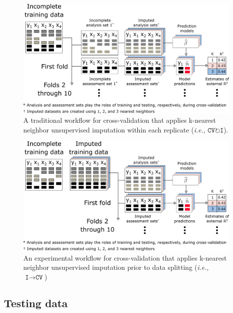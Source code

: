 \documentclass[AMA,STIX1COL,doublespace]{WileyNJD-v2}
\begin{document}
\begin{figure}
\includegraphics[width=1\linewidth]{figs/workflow_CVI} 
\caption{A traditional workflow for cross-validation that applies k-nearest neighbor unsupervised imputation within each replicate (\textit{i.e., }$\texttt{CV}\!\circlearrowright\!\texttt{I}$).}
\label{fig:workflow_cvi}
\end{figure}

\begin{figure}
\includegraphics[width=1\linewidth]{figs/workflow_ICV} 
\caption{An experimental workflow for cross-validation that applies k-nearest neighbor unsupervised imputation prior to data splitting (\textit{i.e., }$\texttt{I}\!\!\rightarrow\!\texttt{CV}$)}
\label{fig:workflow_icv}
\end{figure}

\subsection{Testing data} \label{subsec:testing_data}
\end{document}
